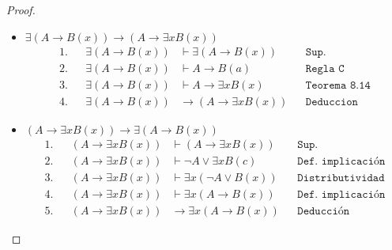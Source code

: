 \documentclass[letterpaper,12pt]{memoir}
\theoremstyle{definition}
\begin{document}
\begin{proof}
  \begin{itemize}
    \item \( \exists (A \rightarrow B(x)) \rightarrow (A \rightarrow \exists xB(x)) \)
    \begin{align*}
      1. & & \exists (A \rightarrow B(x)) &\vdash \exists (A \rightarrow B(x)) & & \texttt{Sup.} \\
      2. & & \exists (A \rightarrow B(x)) &\vdash A \rightarrow B(a) & & \texttt{Regla C} \\
      3. & &  \exists (A \rightarrow B(x)) &\vdash A \rightarrow \exists xB(x) & & \texttt{Teorema 8.14} \\
      4. & & \exists (A \rightarrow B(x)) &\rightarrow (A \rightarrow \exists xB(x)) & & \texttt{Deduccion}
    \end{align*}
    \item \( (A \rightarrow \exists xB(x)) \rightarrow \exists (A \rightarrow B(x)) \)
    \begin{align*}
      1. & & (A \rightarrow \exists xB(x)) &\vdash (A \rightarrow \exists xB(x)) & & \texttt{Sup.} \\
      2. & & (A \rightarrow \exists xB(x)) &\vdash \neg A \lor \exists xB(c)  & & \texttt{Def. implicación}\\
      3. & &  (A \rightarrow \exists xB(x)) &\vdash \exists x(\neg A \lor B(x)) & & \texttt{Distributividad} \\
      4. & & (A \rightarrow \exists xB(x)) &\vdash \exists x(A \rightarrow B(x)) & & \texttt{Def. implicación} \\
      5. & & (A \rightarrow \exists xB(x)) &\rightarrow \exists x(A \rightarrow B(x)) & & \texttt{Deducción} 
    \end{align*}



  \end{itemize}
\end{proof}
\end{document}
